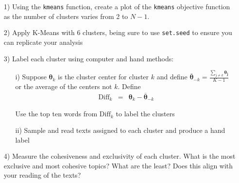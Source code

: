 \documentclass[12pt,letterpaper]{article}
\begin{document}
\begin{itemize}
\item[1)] Using the {\tt kmeans} function, create a plot of the {\tt kmeans} objective function as the number of clusters varies from 2 to $N - 1$.    
\item[2)] Apply K-Means with 6 clusters, being sure to use {\tt set.seed} to ensure you can replicate your analysis
\item[3)] Label each cluster using computer and hand methods:
\begin{itemize}
\item[i)] Suppose $\boldsymbol{\theta}_{k}$ is the cluster center for cluster $k$ and define $\bar{\boldsymbol{\theta}}_{-k} = \frac{\sum_{j \neq k} \boldsymbol{\theta_{j}}   }{K-1 }$ or the average of the centers not $k$.  Define 
\begin{eqnarray}
\text{Diff}_{k} & = & \boldsymbol{\theta}_{k} - \bar{\boldsymbol{\theta}}_{-k}\nonumber 
\end{eqnarray}

Use the top ten words from $\text{Diff}_{k}$ to label the clusters
\item[ii)] Sample and read texts assigned to each cluster and produce a hand label
\end{itemize}
\item[4)] Measure the cohesiveness and exclusivity of each cluster.  What is the most exclusive and most cohesive topics? What are the least?  Does this align with your reading of the texts?

\end{itemize}
\end{document}
